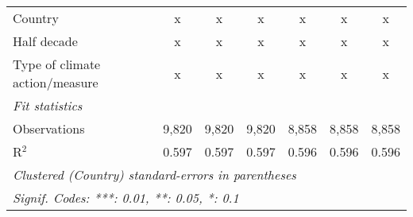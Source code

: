 \begin{tabular}{lcccccc}
   Country                                              & x             & x             & x             & x             & x             & x\\  
   Half decade                                          & x             & x             & x             & x             & x             & x\\  
   Type of climate action/measure                       & x             & x             & x             & x             & x             & x\\  
   \midrule \emph{Fit statistics}\\
   Observations                                         & 9,820         & 9,820         & 9,820         & 8,858         & 8,858         & 8,858\\  
   R$^2$                                                & 0.597         & 0.597         & 0.597         & 0.596         & 0.596         & 0.596\\  
   \midrule
   \multicolumn{7}{l}{\emph{Clustered (Country) standard-errors in parentheses}}\\
   \multicolumn{7}{l}{\emph{Signif. Codes: ***: 0.01, **: 0.05, *: 0.1}}\\
\end{tabular}
\par\endgroup


